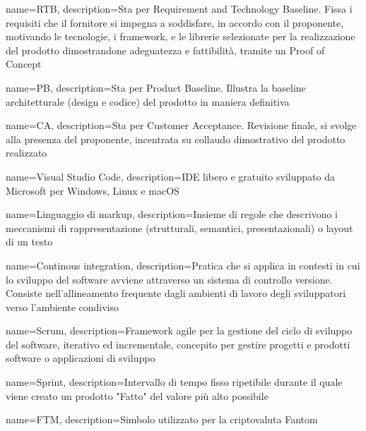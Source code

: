 {
	name={RTB},
	description={Sta per Requirement and Technology Baseline. Fissa i requisiti che il fornitore si impegna a soddisfare, in accordo con il proponente, motivando le tecnologie, i framework, e le librerie selezionate per la realizzazione del prodotto dimostrandone adeguatezza e fattibilità, tramite un Proof of Concept}
}

{
	name={PB},
	description={Sta per Product Baseline. Illustra la baseline architetturale (design e codice) del prodotto in maniera definitiva}
}

{
	name={CA},
	description={Sta per Customer Acceptance. Revisione finale, si svolge alla presenza del proponente, incentrata su collaudo dimostrativo del prodotto realizzato}
}

{
	name={Visual Studio Code},
	description={IDE\glo{} libero e gratuito sviluppato da Microsoft per Windows, Linux e macOS}
}

{
	name={Linguaggio di markup},
	description={Insieme di regole che descrivono i meccanismi di rappresentazione (strutturali, semantici, presentazionali) o layout di un testo}
}

{
	name={Continous integration},
	description={Pratica che si applica in contesti in cui lo sviluppo del software avviene attraverso un sistema di controllo versione. Consiste nell'allineamento frequente dagli ambienti di lavoro degli sviluppatori verso l'ambiente condiviso}
}

{
	name={Scrum},
	description={Framework agile per la gestione del ciclo di sviluppo del software, iterativo ed incrementale, concepito per gestire progetti e prodotti software o applicazioni di sviluppo}
}

{
	name={Sprint},
	description={Intervallo di tempo fisso ripetibile durante il quale viene creato un prodotto "Fatto" del valore più alto possibile}
}

{
	name={FTM},
	description={Simbolo utilizzato per la criptovaluta Fantom}
}


